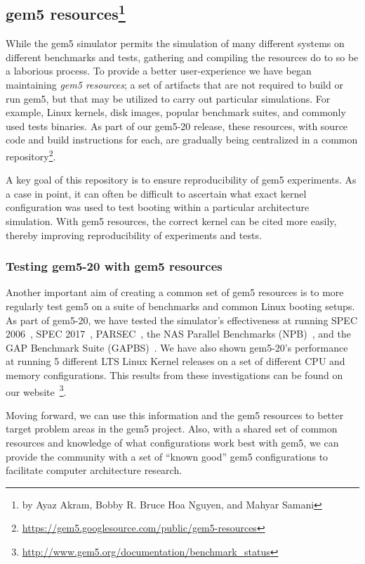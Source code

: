 \subsection[gem5 resources]{gem5 resources\footnote{by Ayaz Akram, Bobby R. Bruce Hoa Nguyen, and Mahyar Samani}}

While the gem5 simulator permits the simulation of many different systems on
different benchmarks and tests, gathering and compiling the resources do to so
be a laborious process. To provide
a better user-experience we have began maintaining \emph{gem5
resources}; a set of artifacts
that are not required to build or run gem5, but that may be utilized to carry out
particular simulations. For example, Linux kernels, disk images, popular
benchmark suites, and commonly used tests binaries. As part of our gem5-20
release, these resources, with source code and build instructions for each, are
gradually being centralized in a common repository\footnote{
\url{https://gem5.googlesource.com/public/gem5-resources}}.

A key goal of this repository is to ensure reproducibility of gem5
experiments. As a case in point, it can often be difficult to ascertain what exact
kernel configuration was used to test booting within a particular architecture
simulation. With gem5 resources, the correct kernel can be cited more easily,
thereby improving reproducibility of experiments and tests.

\subsubsection{Testing gem5-20 with gem5 resources}

Another important aim of creating a common set of gem5 resources is to more
regularly test gem5 on a suite of benchmarks and common Linux booting setups.
As part of gem5-20, we have tested the simulator's effectiveness
at running SPEC 2006~\cite{spec06}, SPEC 2017~\cite{spec17},
PARSEC~\cite{parsec}, the NAS Parallel Benchmarks (NPB)~\cite{npb},
and the GAP Benchmark Suite (GAPBS)~\cite{gapbs}. We have also shown gem5-20's
performance at running 5 different LTS Linux Kernel releases on a set of
different CPU and memory configurations. This results from these investigations
can be found on our website~\footnote{
\url{http://www.gem5.org/documentation/benchmark_status}}.

Moving forward, we can use this information and the gem5 resources to better target problem areas in the gem5 project.
Also, with a shared set of common resources and knowledge of what configurations work best with gem5, we can provide the community with a set of ``known good'' gem5 configurations to facilitate computer architecture research.

